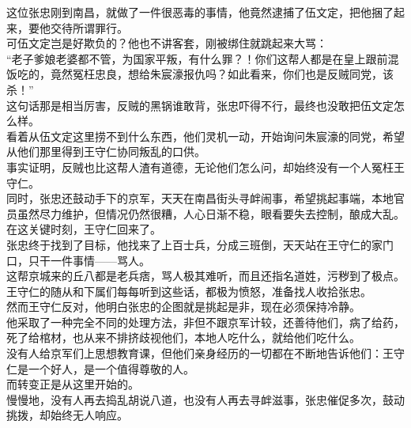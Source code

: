 \begin{multicols}{\theparacolNo}
这位张忠刚到南昌，就做了一件很恶毒的事情，他竟然逮捕了伍文定，把他捆了起来，要他交待所谓罪行。\\

可伍文定岂是好欺负的？他也不讲客套，刚被绑住就跳起来大骂：\\

“老子爹娘老婆都不管，为国家平叛，有什么罪？！你们这帮人都是在皇上跟前混饭吃的，竟然冤枉忠良，想给朱宸濠报仇吗？如此看来，你们也是反贼同党，该杀！”\\

这句话那是相当厉害，反贼的黑锅谁敢背，张忠吓得不行，最终也没敢把伍文定怎么样。\\

看着从伍文定这里捞不到什么东西，他们灵机一动，开始询问朱宸濠的同党，希望从他们那里得到王守仁协同叛乱的口供。\\

事实证明，反贼也比这帮人渣有道德，无论他们怎么问，却始终没有一个人冤枉王守仁。\\

同时，张忠还鼓动手下的京军，天天在南昌街头寻衅闹事，希望挑起事端，本地官员虽然尽力维护，但情况仍然很糟，人心日渐不稳，眼看要失去控制，酿成大乱。\\

在这关键时刻，王守仁回来了。\\

张忠终于找到了目标，他找来了上百士兵，分成三班倒，天天站在王守仁的家门口，只干一件事情——骂人。\\

这帮京城来的丘八都是老兵痞，骂人极其难听，而且还指名道姓，污秽到了极点。\\

王守仁的随从和下属们每每听到这些话，都极为愤怒，准备找人收拾张忠。\\

然而王守仁反对，他明白张忠的企图就是挑起是非，现在必须保持冷静。\\

他采取了一种完全不同的处理方法，非但不跟京军计较，还善待他们，病了给药，死了给棺材，也从来不排挤歧视他们，本地人吃什么，就给他们吃什么。\\

没有人给京军们上思想教育课，但他们亲身经历的一切都在不断地告诉他们：王守仁是一个好人，是一个值得尊敬的人。\\

而转变正是从这里开始的。\\

慢慢地，没有人再去捣乱胡说八道，也没有人再去寻衅滋事，张忠催促多次，鼓动挑拨，却始终无人响应。\\


\end{multicols}
